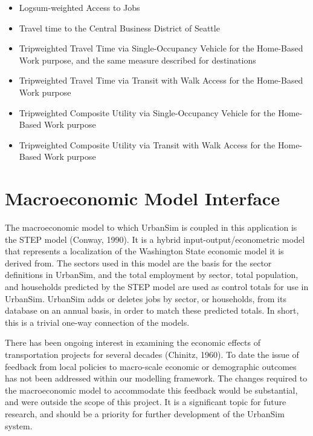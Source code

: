 \begin{itemize}

\item Logsum-weighted Access to Jobs

\item Travel time to the Central Business District of Seattle

\item Trip\-weighted Travel Time via Single-Occupancy Vehicle for
the Home-Based Work purpose, and the same measure described for
destinations

\item Trip\-weighted Travel Time via Transit with Walk Access for
the Home-Based Work purpose

\item Trip\-weighted Composite Utility via Single-Occupancy
Vehicle for the Home-Based Work purpose

\item Trip\-weighted Composite Utility via Transit with Walk
Access for the Home-Based Work purpose

\end{itemize}

\section{Macroeconomic Model Interface}

The macroeconomic model to which UrbanSim is coupled in this
application is the STEP model (Conway, 1990).  It is a hybrid
input-output/econometric model that represents a localization of
the Washington State economic model it is derived from.  The
sectors used in this model are the basis for the sector
definitions in UrbanSim, and the total employment by sector, total
population, and households predicted by the STEP model are used as
control totals for use in UrbanSim.  UrbanSim adds or deletes jobs
by sector, or households, from its database on an annual basis, in
order to match these predicted totals.  In short, this is a
trivial one-way connection of the models.

There has been ongoing interest in examining the economic effects
of transportation projects for several decades (Chinitz, 1960). To
date the issue of feedback from local policies to macro-scale
economic or demographic outcomes has not been addressed within our
modelling framework.  The changes required to the macroeconomic
model to accommodate this feedback would be substantial, and were
outside the scope of this project. It is a significant topic for
future research, and should be a priority for further development
of the UrbanSim system.

